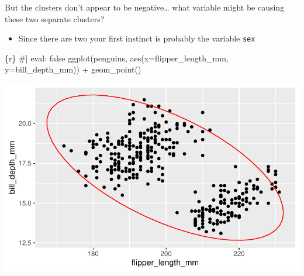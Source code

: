 \documentclass[
  letterpaper,
  DIV=11,
  numbers=noendperiod]{scrreprt}
\newenvironment{Shaded}{\begin{snugshade}}{\end{snugshade}}
\newcommand{\AttributeTok}[1]{\textcolor[rgb]{0.40,0.45,0.13}{#1}}
\newcommand{\CommentTok}[1]{\textcolor[rgb]{0.37,0.37,0.37}{#1}}
\newcommand{\FunctionTok}[1]{\textcolor[rgb]{0.28,0.35,0.67}{#1}}
\newcommand{\InformationTok}[1]{\textcolor[rgb]{0.37,0.37,0.37}{#1}}
\newcommand{\NormalTok}[1]{\textcolor[rgb]{0.00,0.23,0.31}{#1}}
\newcommand{\SpecialCharTok}[1]{\textcolor[rgb]{0.37,0.37,0.37}{#1}}
\providecommand{\tightlist}{%
  \setlength{\itemsep}{0pt}\setlength{\parskip}{0pt}}\usepackage{longtable,booktabs,array}
\begin{document}
\begin{tcolorbox}[enhanced jigsaw, breakable, colback=white, bottomrule=.15mm, leftrule=.75mm, colframe=quarto-callout-important-color-frame, arc=.35mm, rightrule=.15mm, toprule=.15mm, left=2mm, opacityback=0]

But the clusters don't appear to be negative\ldots{} what variable might
be causing these two separate clusters?

\begin{itemize}
\tightlist
\item
  Since there are two your first instinct is probably the variable
  \texttt{sex}
\end{itemize}

\end{tcolorbox}

\begin{tcolorbox}[enhanced jigsaw, breakable, colback=white, bottomrule=.15mm, leftrule=.75mm, colframe=quarto-callout-note-color-frame, arc=.35mm, rightrule=.15mm, toprule=.15mm, left=2mm, opacityback=0]

\begin{Shaded}
\begin{Highlighting}[]
\InformationTok{\textasciigrave{}\textasciigrave{}\textasciigrave{}\{r\}}
\CommentTok{\#| eval: false}
\FunctionTok{ggplot}\NormalTok{(penguins, }\FunctionTok{aes}\NormalTok{(}\AttributeTok{x=}\NormalTok{flipper\_length\_mm, }\AttributeTok{y=}\NormalTok{bill\_depth\_mm)) }\SpecialCharTok{+}
  \FunctionTok{geom\_point}\NormalTok{()}
\InformationTok{\textasciigrave{}\textasciigrave{}\textasciigrave{}}
\end{Highlighting}
\end{Shaded}

\includegraphics{03-content_files/figure-pdf/unnamed-chunk-7-1.pdf}

\end{tcolorbox}
\end{document}
